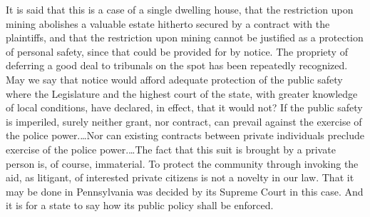 It is said that this is a case of a single dwelling house, that the restriction
upon mining abolishes a valuable estate hitherto secured by a contract with the
plaintiffs, and that the restriction upon mining cannot be justified as a
protection of personal safety, since that could be provided for by notice. The
propriety of deferring a good deal to tribunals on the spot has been repeatedly
recognized. May we say that notice would afford adequate protection of the
public safety where the Legislature and the highest court of the state, with
greater knowledge of local conditions, have declared, in effect, that it would
not? If the public safety is imperiled, surely neither grant, nor contract, can
prevail against the exercise of the police power.\ldots Nor can existing
contracts between private individuals preclude exercise of the police
power.\ldots The fact that this suit is brought by a private person is, of
course, immaterial. To protect the community through invoking the aid, as
litigant, of interested private citizens is not a novelty in our law. That it
may be done in Pennsylvania was decided by its Supreme Court in this case. And
it is for a state to say how its public policy shall be enforced.

